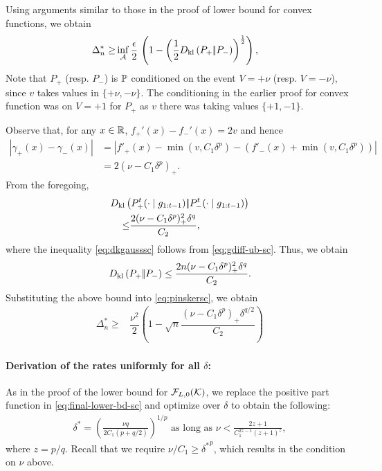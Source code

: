 Using arguments similar to those in the proof of lower bound for convex functions, we obtain
\begin{align}
\Delta_n^{*} %
  \ge  &\inf_{\A} \dfrac{\epsilon }{2}  \,\left( 1 - \left(\frac12\dkl{P_{+}}{P_{-}}\right)^{\frac{1}{2}}\right), \label{eq:pinskersc}
\end{align}
Note that $P_+$ (resp. $P_-$) is $\P$ conditioned on the event $V=+\nu$ (resp. $V=-\nu$), since $v$ takes values in $\{+\nu,-\nu\}$. The conditioning in the earlier proof for convex function was on $V=+1$ for $P_+$ as $v$ there was taking values $\{+1,-1\}$.

Observe that, for any $x\in \R$, $f_+'(x) - f_-'(x) = 2v$ and hence
\begin{align}
 |\gamma_+(x) - \gamma_-(x)| 
& = | f'_+(x) - \min(v,C_1 \delta^p) - (f'_-(x)+\min(v,C_1 \delta^p)) | \nonumber \\
& = 2 (\nu - C_1 \delta^p)_+.
 \label{eq:gdiff-ub-sc}
\end{align}
From the foregoing, 
\begin{align}
 \MoveEqLeft \dkl{P_{+}^t(\cdot\mid g_{1:t-1})}{P_{-}^t(\cdot\mid g_{1:t-1})}\nonumber\\
 \le & \dfrac{2(\nu-C_1\delta^p)_+^2\delta^q}{C_2},\label{eq:dkgausssc}
\end{align}
where the inequality \eqref{eq:dkgausssc} follows from \eqref{eq:gdiff-ub-sc}.
Thus, we obtain
\begin{align}
\dkl{P_{+}}{P_{-}} \le \dfrac{2n(\nu-C_1\delta^p)_+^2 \delta^q}{C_2}.
\end{align}
Substituting the above bound into \eqref{eq:pinskersc}, we obtain 
\begin{align}
 \Delta_n^{*}
  \ge & \dfrac{\nu^2}{2} \left(1 - \sqrt{
    n}  \dfrac{(\nu-C_1\delta^p)_+\delta^{q/2}}{C_2}
  \right)\label{eq:final-lower-bd-sc}
\end{align}


\paragraph{Derivation of the rates uniformly for all $\delta$:}
As in the proof of the lower bound for $\F_{L,0}(\K)$, we replace the positive part function in \eqref{eq:final-lower-bd-sc} and optimize over $\delta$ to obtain the following:
\begin{align}
\delta^*=\left(\frac{\nu q}{2C_1(p+q/2)}\right)^{1/p} \text{ as long as }\nu<\frac{2z+1}{C_1^{2z-1}(z+1)^z},
\label{eq:deltastar-sc}
\end{align}
where $z=p/q$. Recall that we require $\nu/C_1 \ge {\delta^*}^p$, which results in the condition on $\nu$ above.

